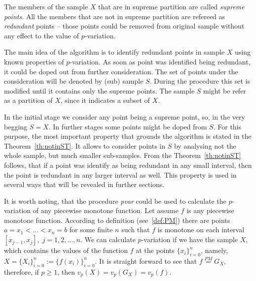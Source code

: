 \documentclass[12pt, a4paper]{article}
\numberwithin{equation}{section}
\begin{document}
The members of the sample $X$ that are in supreme partition are
called \emph{supreme points}. All the members
that are not in supreme partition are refereed as
\emph{redundant} points -- 
those points could be removed from original sample without any effect to 
the value of $p$-variation.

The main idea of the algorithm is 
to identify redundant points in sample $X$ using known properties of
$p$-variation. As soon as point was identified being redundant, it could be 
doped out from further consideration. 
The set of points under the consideration 
will be denoted by (sub) sample $S$.
During the procedure this set is modified until it contains only the 
supreme points. 
The sample $S$ might be refer as a partition of $X$, 
since it indicates a subset of $X$.


In the initial stage we consider any point being a supreme point, 
so, in the very begging $S=X$. In further stages
some points might be doped from $S$.
For this purpose, 
the most important property that grounds
the algorithm is
stated in the Theorem~\ref{th:notinST}.
It allows to consider points in $S$ by analysing
not the whole sample, but much
smaller sub-samples. From the
Theorem~\ref{th:notinST} follows, that 
if a point was identify as being redundant in any
small interval, then the point is redundant in
any larger interval as well. 
This property is used in several ways that will be revealed in 
further sections.




It is worth noting, 
that the procedure \emph{pvar} could be used to calculate
the $p$-variation of any piecewise monotone function.
Let assume $f$ is any piecewise monotone function.  
According to definition (see~\ref{def:PM}) 
there are points $a=x_1<\dots<x_n=b$ for some finite $n$ such 
that $f$ is monotone on each interval 
$[x_{j-1},x_j],\;j=1,2,\dots,n$.
We can calculate $p$-variation if we have the sample $X$, 
which contains the values of the function $f$ 
at the points $\{x_{i}\}_{i=0}^{n}$, namely,
$X=\{X_{i}\}_{i=0}^{n}:=\{f(x_{i})\}_{i=0}^{n}$.
It is straight forward to see that 
$f \stackrel{PM}{=} G_X$, 
therefore, if $p \geq 1$, then $v_p(X)=v_p(G_X)=v_p(f)$.
\end{document}
